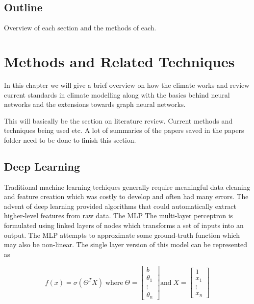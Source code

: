 \documentclass[honours,12pt]{unswthesis}
\numberwithin{equation}{section}
\begin{document}
{\section{Outline}}\label{approach}
Overview of each section and the methods of each. 


\chapter{Methods and Related Techniques}



In this chapter we will give a brief overview on how the climate works and review 
current standards in climate modelling along with the basics
behind neural networks and the extensions towards graph neural networks.

This will basically be the section on literature review. Current methods and techniques being
used etc. A lot of summaries of the papers saved in the papers folder need to be done to 
finish this section.


\section{Deep Learning}\label{nn}
Traditional machine learning techiques generally require meaningful data cleaning and feature creation which was costly to develop and 
often had many errors. The advent of deep learning provided algorithms that could automatically extract higher-level features from raw data.\cite{deng-deep-learning} The MLP 
The multi-layer perceptron\cite{rumelhart1986learning} is formulated using linked layers of nodes which transforms a set of inputs into an output.
The MLP attempts to approximate some ground-truth function which may also be non-linear. The single layer version of this model can be represented as

\begin{equation}
    f(x) = \sigma(\Theta^T X)  \; \text{where}  \; \Theta= \begin{bmatrix} b \\ \theta_1 \\ \vdots \\ \theta_n \end{bmatrix} \text{and} \; X = \begin{bmatrix} 1 \\ x_1 \\ \vdots \\ x_n \end{bmatrix}
\end{equation}
\end{document}
